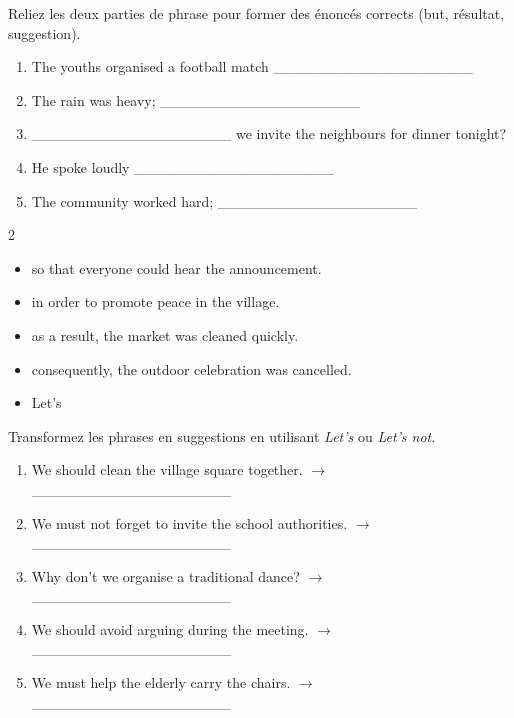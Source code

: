 \documentclass[11pt]{article}
\begin{document}
\begin{exercice}
Reliez les deux parties de phrase pour former des énoncés corrects (but, résultat, suggestion).
\begin{enumerate}
    \item The youths organised a football match \_\_\_\_\_\_\_\_\_\_\_\_\_\_\_\_\_\_\_
    \item The rain was heavy; \_\_\_\_\_\_\_\_\_\_\_\_\_\_\_\_\_\_\_
    \item \_\_\_\_\_\_\_\_\_\_\_\_\_\_\_\_\_\_\_ we invite the neighbours for dinner tonight?
    \item He spoke loudly \_\_\_\_\_\_\_\_\_\_\_\_\_\_\_\_\_\_\_
    \item The community worked hard; \_\_\_\_\_\_\_\_\_\_\_\_\_\_\_\_\_\_\_
\end{enumerate}
\begin{multicols}{2}
    \begin{itemize}
        \item[A.] so that everyone could hear the announcement.
        \item[B.] in order to promote peace in the village.
        \item[C.] as a result, the market was cleaned quickly.
        \item[D.] consequently, the outdoor celebration was cancelled.
        \item[E.] Let's
    \end{itemize}
\end{multicols}
\end{exercice}

\begin{exercice}
Transformez les phrases en suggestions en utilisant \textit{Let's} ou \textit{Let's not}.
\begin{enumerate}
    \item We should clean the village square together. $\rightarrow$ \_\_\_\_\_\_\_\_\_\_\_\_\_\_\_\_\_\_\_
    \item We must not forget to invite the school authorities. $\rightarrow$ \_\_\_\_\_\_\_\_\_\_\_\_\_\_\_\_\_\_\_
    \item Why don't we organise a traditional dance? $\rightarrow$ \_\_\_\_\_\_\_\_\_\_\_\_\_\_\_\_\_\_\_
    \item We should avoid arguing during the meeting. $\rightarrow$ \_\_\_\_\_\_\_\_\_\_\_\_\_\_\_\_\_\_\_
    \item We must help the elderly carry the chairs. $\rightarrow$ \_\_\_\_\_\_\_\_\_\_\_\_\_\_\_\_\_\_\_
\end{enumerate}
\end{exercice}
\end{document}
